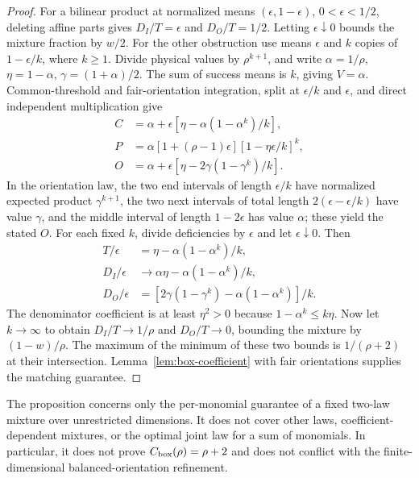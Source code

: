 \begin{proof}
For a bilinear product at normalized means $(\epsilon,1-\epsilon)$,
$0<\epsilon<1/2$, deleting affine parts gives
$D_I/T=\epsilon$ and $D_O/T=1/2$. Letting $\epsilon\downarrow0$
bounds the mixture fraction by $w/2$.
For the other obstruction use means $\epsilon$ and $k$ copies of
$1-\epsilon/k$, where $k\ge1$. Divide physical values by $\rho^{k+1}$,
and write $\alpha=1/\rho$, $\eta=1-\alpha$, $\gamma=(1+\alpha)/2$.
The sum of success means is $k$, giving $V=\alpha$.
Common-threshold and fair-orientation integration, split at
$\epsilon/k$ and $\epsilon$, and direct independent multiplication give
\[
 \begin{split}
 C&=\alpha+\epsilon[\eta-\alpha(1-\alpha^k)/k],\\
 P&=\alpha[1+(\rho-1)\epsilon][1-\eta\epsilon/k]^k,\\
 O&=\alpha+\epsilon[\eta-2\gamma(1-\gamma^k)/k].
 \end{split}
\]
In the orientation law, the two end intervals of length
$\epsilon/k$ have normalized expected product $\gamma^{k+1}$,
the two next intervals of total length $2(\epsilon-\epsilon/k)$
have value $\gamma$, and the middle interval of length $1-2\epsilon$
has value $\alpha$; these yield the stated $O$.
For each fixed $k$, divide deficiencies by $\epsilon$ and let
$\epsilon\downarrow0$. Then
\[
 \begin{split}
 T/\epsilon&=\eta-\alpha(1-\alpha^k)/k,\\
 D_I/\epsilon&\longrightarrow\alpha\eta-\alpha(1-\alpha^k)/k,\\
 D_O/\epsilon&=[2\gamma(1-\gamma^k)-\alpha(1-\alpha^k)]/k.
 \end{split}
\]
The denominator coefficient is at least $\eta^2>0$ because
$1-\alpha^k\le k\eta$. Now let $k\to\infty$ to obtain
$D_I/T\to1/\rho$ and $D_O/T\to0$, bounding the mixture by
$(1-w)/\rho$. The maximum of the minimum of these two bounds is
$1/(\rho+2)$ at their intersection. Lemma~\ref{lem:box-coefficient}
with fair orientations supplies the matching guarantee.
\end{proof}
The proposition concerns only the per-monomial guarantee of a fixed
two-law mixture over unrestricted dimensions. It does not cover other
laws, coefficient-dependent mixtures, or the optimal joint law for a
sum of monomials. In particular, it does not prove
$C_{\rm box}(\rho)=\rho+2$ and does not conflict with the
finite-dimensional balanced-orientation refinement.
